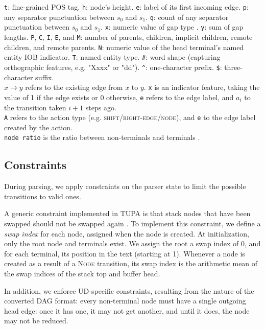 \documentclass[11pt,a4paper]{article}
\begin{document}
\begin{table}[h]
{\texttt{t}: fine-grained POS tag.
\texttt{h}: node's height.
\texttt{e}: label of its first incoming edge.
\texttt{p}: any separator punctuation between $s_0$ and $s_1$.
\texttt{q}: count of any separator punctuation between $s_0$ and $s_1$.
\texttt{x}: numeric value of gap type \cite{maier-lichte:2016:DiscoNLP}.
\texttt{y}: sum of gap lengths.
\texttt{P}, \texttt{C}, \texttt{I}, \texttt{E}, and \texttt{M}: number of
parents, children, implicit children, remote children, and remote parents.
\texttt{N}: numeric value of the head terminal's named entity IOB indicator.
\texttt{T}: named entity type.
\texttt{\#}: word shape (capturing orthographic features, e.g. "Xxxx" or "dd").
\texttt{\^{}}: one-character prefix.
\texttt{\$}: three-character suffix.\\
$x \to y$ refers to the existing edge from $x$ to $y$.
\texttt{x} is an indicator feature, taking the value of 1 if the edge exists or 0 otherwise,
\texttt{e} refers to the edge label, and
$a_i$ to the transition taken $i+1$ steps ago.\\
\texttt{A} refers to the action type (e.g. \textsc{shift}/\textsc{right-edge}/\textsc{node}), and
\texttt{e} to the edge label created by the action.\\
\texttt{node ratio} is the ratio between non-terminals and terminals \cite{hershcovich2017a}.}
\end{table}

\subsection{Constraints}\label{sec:constraints}
During parsing, we apply constraints on the parser state
to limit the possible transitions to valid ones.

A generic constraint implemented in TUPA is that stack nodes 
that have been swapped
should not be swapped again \cite{hershcovich2018multitask}.
 To implement this constraint, we define a \textit{swap index}
 for each node, assigned when the node is created.
 At initialization, only the root node and terminals exist.
 We assign the root a swap index of 0, and for each terminal, its
 position in the text (starting at 1).
 Whenever a node is created as a result of a \textsc{Node}
 transition, its swap index is the arithmetic
 mean of the swap indices of the stack top and buffer head.
 
In addition, we enforce UD-specific constraints, resulting from
the nature of the converted DAG format:
every non-terminal node must have a single outgoing \textrm{head} edge:
once it has one, it may not get another, and
until it does, the node may not be reduced.
\end{document}
